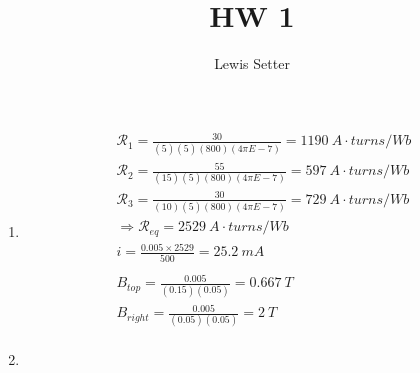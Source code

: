 \documentclass[fleqn]{article}
\title{HW 1}
\author{Lewis Setter}
\begin{document}
\maketitle
    \begin{enumerate}
        \item
            \begin{multline}
                \mathcal{R}_1 = \frac{30}{(5)(5)(800)(4\pi E-7)} = 1190\ A\cdot turns/Wb\\
                \mathcal{R}_2 = \frac{55}{(15)(5)(800)(4\pi E-7)} = 597\ A\cdot turns/Wb\\
                \mathcal{R}_3 = \frac{30}{(10)(5)(800)(4\pi E-7)} = 729\ A\cdot turns/Wb\\
                \Rightarrow \mathcal{R}_{eq} = 2529\ A\cdot turns/Wb \\
                i = \frac{0.005\times2529}{500} = 25.2\ mA \\
                \\
                B_{top} = \frac{0.005}{(0.15)(0.05)} = 0.667\ T\\
                B_{right} = \frac{0.005}{(0.05)(0.05)} = 2\ T\\
            \end{multline}
        \item
            \begin{multline}
                
            \end{multline}
    \end{enumerate}
\end{document}
